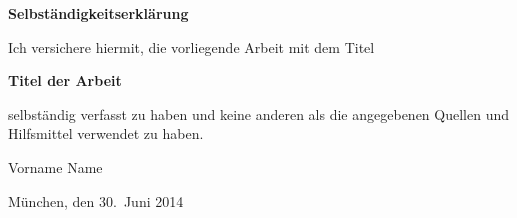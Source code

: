 \documentclass[a4paper,11pt,twoside,openright]{report}
\begin{document}
    


    


    


    


    \cleardoublepage
    \printbibliography


    \begin{appendix}
        
    \end{appendix}


    \clearpage{\pagestyle{empty}\cleardoublepage}
    \thispagestyle{empty}
    \vspace*{1cm}
    {\huge \textbf{Selbständigkeitserklärung}}\\
    \vspace*{1.5cm}

    Ich versichere hiermit, die vorliegende Arbeit mit dem Titel

    \begin{center}
        \textbf{Titel der Arbeit}
    \end{center}

    selbständig verfasst zu haben und keine anderen als die angegebenen Quellen und Hilfsmittel verwendet zu haben.

    \vspace*{3cm}

    Vorname Name

    \vspace*{1cm}
    München, den 30.~Juni 2014
\end{document}
